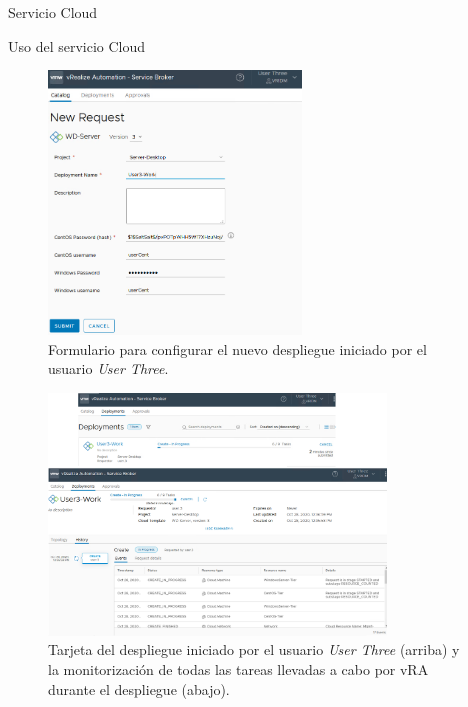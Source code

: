 \begin{subsection}{Servicio Cloud}
\begin{subsubsection}{Uso del servicio Cloud}
\begin{figure}[h]
            \includegraphics[width=0.6\textwidth]{imaxes/pruebaconcepto/vrealize/deployment-user-3-Windows.png}
            \caption{Formulario para configurar el nuevo despliegue iniciado por el usuario \textit{User Three}.}
            \label{fig:login-user-3-form-deployment}
        \end{figure}
        \FloatBarrier
        \begin{figure}[h]
            \centering
            \includegraphics[width=0.8\textwidth]{imaxes/pruebaconcepto/vrealize/deployment-start-user-3-Windows.png}
            \caption{Tarjeta del despliegue iniciado por el usuario \textit{User Three} (arriba) y la monitorización de todas las tareas llevadas a cabo por vRA durante el despliegue (abajo).}
            \label{fig:deployment-process-user-3}
        \end{figure}
        \FloatBarrier

\end{subsubsection}
\end{subsection}
